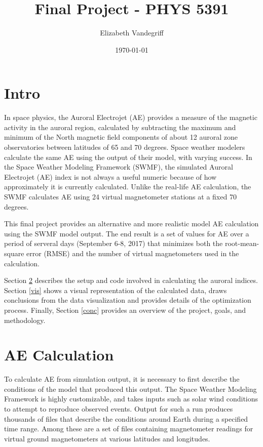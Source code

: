 \documentclass[12pt, letterpaper]{article}
\begin{document}
\title{Final Project - PHYS 5391}
\author{Elizabeth Vandegriff}
\date{\today}

\maketitle
\newpage
\tableofcontents
\newpage

\section{Intro} \label{intro}

In space physics, the Auroral Electrojet (AE) provides a measure of the magnetic activity in the auroral region, calculated by subtracting the maximum and minimum of the North magnetic field components of about 12 auroral zone observatories between latitudes of 65 and 70 degrees. Space weather modelers calculate the same AE using the output of their model, with varying success. In the Space Weather Modeling Framework (SWMF), the simulated Auroral Electrojet (AE) index is not always a useful numeric because of how approximately it is currently calculated. Unlike the real-life AE calculation, the SWMF calculates AE using 24 virtual magnetometer stations at a fixed 70 degrees.

This final project provides an alternative and more realistic model AE calculation using the SWMF model output. The end result is a set of values for AE over a period of serveral days (September 6-8, 2017) that minimizes both the root-mean-square error (RMSE) and the number of virtual magnetometers used in the calculation.

Section \ref{calc} describes the setup and code involved in calculating the auroral indices. Section \ref{vis} shows a visual representation of the calculated data, draws conclusions from the data visualization and provides details of the optimization process. Finally, Section \ref{conc} provides an overview of the project, goals, and methodology.


\section{AE Calculation} \label{calc}

To calculate AE from simulation output, it is necessary to first describe the conditions of the model that produced this output. The Space Weather Modeling Framework is highly customizable, and takes inputs such as solar wind conditions to attempt to reproduce observed events. Output for such a run produces thousands of files that describe the conditions around Earth during a specified time range. Among these are a set of files containing magnetometer readings for virtual ground magnetometers at various latitudes and longitudes.
\end{document}
